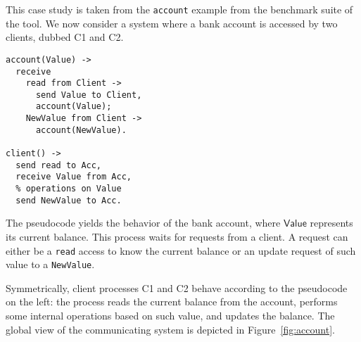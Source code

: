 This case study is taken from the \texttt{account} example from the benchmark 
suite of the tool.
We now consider a system where a bank account is accessed
by two clients, dubbed C1 and C2.
% 

\bigskip

\begin{lstlisting}
account(Value) ->
  receive
    read from Client ->
      send Value to Client,
      account(Value);
    NewValue from Client ->
      account(NewValue).

client() ->
  send read to Acc,
  receive Value from Acc,
  % operations on Value
  send NewValue to Acc.
\end{lstlisting}

\bigskip

The pseudocode yields the behavior of the bank account,
where $\mathsf{Value}$ represents its current balance.
This process waits for requests from a client.
A request can either be a \lstinline{read} access to know
the current balance or an update request of such value to a
\lstinline{NewValue}.

Symmetrically, client processes C1 and C2 behave according to the
pseudocode on the left: the process reads the current balance
from the account,
performs some internal operations based on such value, and
updates the balance.
%
The global view of the communicating system is depicted in
Figure~\ref{fig:account}.

